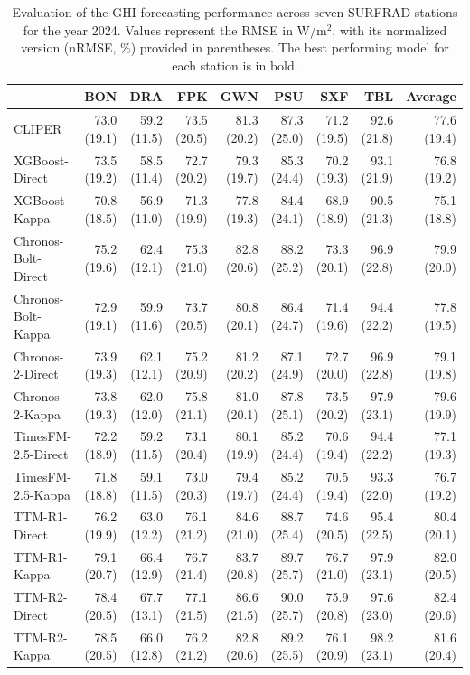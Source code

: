 \documentclass[number, 3p, 10pt, times]{elsarticle}
\begin{document}
\begin{table}[!ht]
\centering
\caption{Evaluation of the GHI forecasting performance across seven SURFRAD stations for the year 2024. Values represent the RMSE in W/m$^2$, with its normalized version (nRMSE, \%) provided in parentheses. The best performing model for each station is in bold.}
\label{tb:RMSEGh}
\footnotesize
\begin{tabular}{lrrrrrrrr}
\toprule
 & BON & DRA & FPK & GWN & PSU & SXF & TBL & Average \\
\midrule
CLIPER & 73.0 (19.1) & 59.2 (11.5) & 73.5 (20.5) & 81.3 (20.2) & 87.3 (25.0) & 71.2 (19.5) & 92.6 (21.8) & 77.6 (19.4) \\
XGBoost-Direct & 73.5 (19.2) & 58.5 (11.4) & 72.7 (20.2) & 79.3 (19.7) & 85.3 (24.4) & 70.2 (19.3) & 93.1 (21.9) & 76.8 (19.2) \\
XGBoost-Kappa & 70.8 (18.5) & 56.9 (11.0) & 71.3 (19.9) & 77.8 (19.3) & 84.4 (24.1) & 68.9 (18.9) & 90.5 (21.3) & 75.1 (18.8) \\
Chronos-Bolt-Direct & 75.2 (19.6) & 62.4 (12.1) & 75.3 (21.0) & 82.8 (20.6) & 88.2 (25.2) & 73.3 (20.1) & 96.9 (22.8) & 79.9 (20.0) \\
Chronos-Bolt-Kappa & 72.9 (19.1) & 59.9 (11.6) & 73.7 (20.5) & 80.8 (20.1) & 86.4 (24.7) & 71.4 (19.6) & 94.4 (22.2) & 77.8 (19.5) \\
Chronos-2-Direct & 73.9 (19.3) & 62.1 (12.1) & 75.2 (20.9) & 81.2 (20.2) & 87.1 (24.9) & 72.7 (20.0) & 96.9 (22.8) & 79.1 (19.8) \\
Chronos-2-Kappa & 73.8 (19.3) & 62.0 (12.0) & 75.8 (21.1) & 81.0 (20.1) & 87.8 (25.1) & 73.5 (20.2) & 97.9 (23.1) & 79.6 (19.9) \\
TimesFM-2.5-Direct & 72.2 (18.9) & 59.2 (11.5) & 73.1 (20.4) & 80.1 (19.9) & 85.2 (24.4) & 70.6 (19.4) & 94.4 (22.2) & 77.1 (19.3) \\
TimesFM-2.5-Kappa & 71.8 (18.8) & 59.1 (11.5) & 73.0 (20.3) & 79.4 (19.7) & 85.2 (24.4) & 70.5 (19.4) & 93.3 (22.0) & 76.7 (19.2) \\
TTM-R1-Direct & 76.2 (19.9) & 63.0 (12.2) & 76.1 (21.2) & 84.6 (21.0) & 88.7 (25.4) & 74.6 (20.5) & 95.4 (22.5) & 80.4 (20.1) \\
TTM-R1-Kappa & 79.1 (20.7) & 66.4 (12.9) & 76.7 (21.4) & 83.7 (20.8) & 89.7 (25.7) & 76.7 (21.0) & 97.9 (23.1) & 82.0 (20.5) \\
TTM-R2-Direct & 78.4 (20.5) & 67.7 (13.1) & 77.1 (21.5) & 86.6 (21.5) & 90.0 (25.7) & 75.9 (20.8) & 97.6 (23.0) & 82.4 (20.6) \\
TTM-R2-Kappa & 78.5 (20.5) & 66.0 (12.8) & 76.2 (21.2) & 82.8 (20.6) & 89.2 (25.5) & 76.1 (20.9) & 98.2 (23.1) & 81.6 (20.4) \\

\end{tabular}
\end{table}
\end{document}
